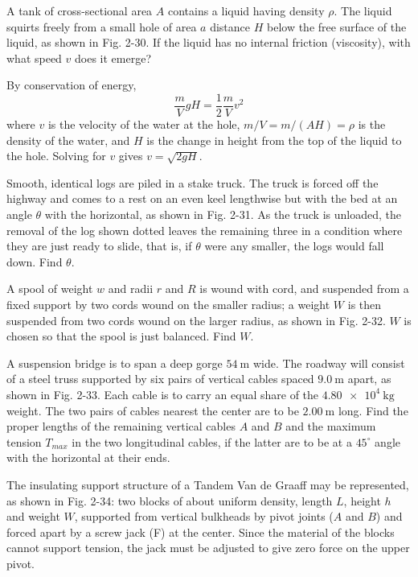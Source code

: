 \documentclass[../feynman-lectures-on-physics.tex]{subfiles}
\begin{document}
\begin{questions}
\question A tank of cross-sectional area $A$ contains a liquid having density $\rho$. The liquid squirts freely from a small hole of area $a$ distance $H$ below the free surface of the liquid, as shown in Fig. 2-30. If the liquid has no internal friction (viscosity), with what speed $v$ does it emerge?

\begin{solution}
	By conservation of energy,
	\[
	\frac{m}{V}gH = \frac{1}{2}\frac{m}{V}v^2
	\] 
	where $v$ is the velocity of the water at the hole, $m/V = m/(AH) = \rho$ is the density of the water, and $H$ is the change in height from the top of the liquid to the hole. Solving for $v$ gives $v=\sqrt{2gH}$.
\end{solution}

\question Smooth, identical logs are piled in a stake truck. The truck is forced off the highway and comes to a rest on an even keel lengthwise but with the bed at an angle $\theta$ with the horizontal, as shown in Fig. 2-31. As the truck is unloaded, the removal of the log shown dotted leaves the remaining three in a condition where they are just ready to slide, that is, if $\theta$ were any smaller, the logs would fall down. Find $\theta$.

\question A spool of weight $w$ and radii $r$ and $R$ is wound with cord, and suspended from a fixed support by two cords wound on the smaller radius; a weight $W$ is then suspended from two cords wound on the larger radius, as shown in Fig. 2-32. $W$ is chosen so that the spool is just balanced. Find $W$.

\question A suspension bridge is to span a deep gorge $\SI{54}{\meter}$ wide. The roadway will consist of a steel truss supported by six pairs of vertical cables spaced $\SI{9.0}{\meter}$ apart, as shown in Fig. 2-33. Each cable is to carry an equal share of the $\SI{4.80e4}{\kilo\gram}$ weight. The two pairs of cables nearest the center are to be $\SI{2.00}{\meter}$ long. Find the proper lengths of the remaining vertical cables $A$ and $B$ and the maximum tension $T_{max}$ in the two longitudinal cables, if the latter are to be at a $45^\circ$ angle with the horizontal at their ends.

\question The insulating support structure of a Tandem Van de Graaff may be represented, as shown in Fig. 2-34: two blocks of about uniform density, length $L$, height $h$ and weight $W$, supported from vertical bulkheads by pivot joints ($A$ and $B$) and forced apart by a screw jack (F) at the center. Since the material of the blocks cannot support tension, the jack must be adjusted to give zero force on the upper pivot.

\end{questions}
\end{document}
